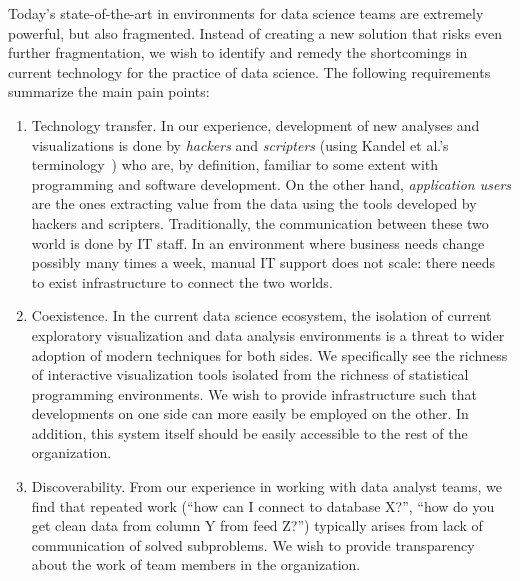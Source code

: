 


Today's state-of-the-art in environments for data science teams are extremely
powerful, but also fragmented. Instead of creating a new solution that risks
even further fragmentation, we wish to identify and remedy the shortcomings
in current technology for the practice of data science. The following
requirements summarize the main pain points:

\begin{enumerate}

\item Technology transfer. In our experience, development
of new analyses and visualizations is done by \emph{hackers}
and \emph{scripters} (using Kandel et al.'s
terminology~\cite{Kandel:2012:EDA}) who are, by definition, familiar
to some extent with programming and software development.
On the other hand, \emph{application
users} are the ones extracting value from the data using the tools
developed by hackers and scripters. Traditionally, the communication
between these two world is done by IT staff. In an environment where
business needs change possibly many times a week, manual IT support
does not scale: there needs to exist
infrastructure to connect the two worlds.

\item Coexistence. In the current data science ecosystem, the
isolation of current exploratory visualization and data analysis
environments is a threat to wider adoption of modern techniques for
both sides. We specifically see the richness of interactive
visualization tools isolated from the richness of statistical
programming environments.
We wish to provide infrastructure such that
developments on one side can more easily be employed on the other. In
addition, this system itself should be easily accessible
to the rest of the organization.

\item Discoverability. From our experience in working with data
analyst teams, we find that repeated work (``how can I connect to
database X?'', ``how do you get clean data from column Y from feed
Z?'') typically arises from lack of communication of solved
subproblems. We wish to provide transparency about the work of
team members in the organization.

\end{enumerate}

